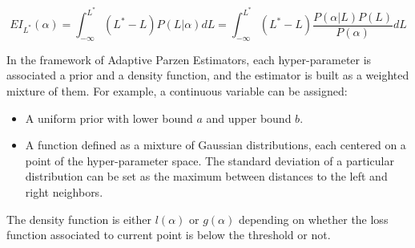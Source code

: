   \begin{equation}
    EI_{L^*}(\alpha) = \int_{-\infty}^{L^*} (L^* - L) P(L \vert \alpha) dL 
    = \int_{-\infty}^{L^*} (L^* - L) \frac{P(\alpha \vert L) P(L)}{P(\alpha)} dL
  \end{equation}

  In the framework of Adaptive Parzen Estimators, each hyper-parameter is associated a prior and a density function,
  and the estimator is built as a weighted mixture of them.
  For example, a continuous variable can be assigned:
  \begin{itemize}
    \item A uniform prior with lower bound $a$ and upper bound $b$.
    \item A function defined as a mixture of Gaussian distributions, each centered on a point of the hyper-parameter
    space. The standard deviation of a particular distribution can be set as the maximum between distances to the left and right
    neighbors.
  \end{itemize}

  The density function is either $l(\alpha)$ or $g(\alpha)$ depending on whether the loss function associated to current
  point is below the threshold or not.

